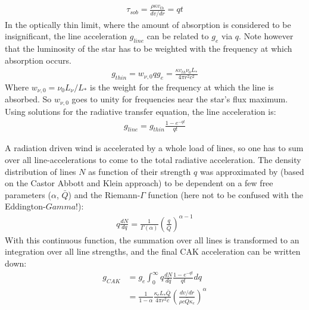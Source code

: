 \begin{align}
\tau_{sob} = \frac{\rho \kappa v_{th}}{dv/dr} = qt
\end{align}
In the optically thin limit, where the amount of absorption is considered to be insignificant, the line acceleration $g_{line}$ can be related to $g_e$ via $q$. Note however that the luminosity of the star has to be weighted with the frequency at which absorption occurs. 
\begin{align}
g_{thin} = w_{\nu,0} q g_e = \frac{\kappa v_{th} \nu_0 L_*}{4 \pi r^2 c^2}
\end{align}
Where $w_{\nu,0} = \nu_0 L_\nu / L_*$ is the weight for the frequency at which the line is absorbed. So $w_{\nu,0}$ goes to unity for frequencies near the star's flux maximum. Using solutions for the radiative transfer equation, the line acceleration is:
\begin{align}
g_{line} = g_{thin} \frac{1 - e^{-qt}}{qt} 
\end{align}

A radiation driven wind is accelerated by a whole load of lines, so one has to sum over all line-accelerations to come to the total radiative acceleration. The density distribution of lines $N$ as function of their strength $q$ was approximated by \citep{Gayley1995} (based on the Castor Abbott and Klein  approach) to be dependent on a few free parameters ($\alpha$, $\bar{Q}$) and the Riemann-$\Gamma$ function (here not to be confused with the Eddington-$Gamma$!):
\begin{align} 
q \frac{dN}{dq} = \frac{1}{\Gamma(\alpha)} \left(\frac{q}{\bar{Q}} \right)^{\alpha - 1}
\end{align}
With this continuous function, the summation over all lines is transformed to an integration over all line strengths, and the final CAK acceleration can be written down:
\begin{align}
g_{CAK} &= g_e \int_0^\infty q \frac{dN}{dq} \frac{1 - e^{-qt}}{qt} dq \\
        &= \frac{1}{1-\alpha} \frac{\kappa_e L_* \bar{Q}}{4\pi r^2 c} \left( \frac{dv/dr}{\rho c \bar{Q} \kappa_e} \right)^\alpha \label{g_CAK}
\end{align}

